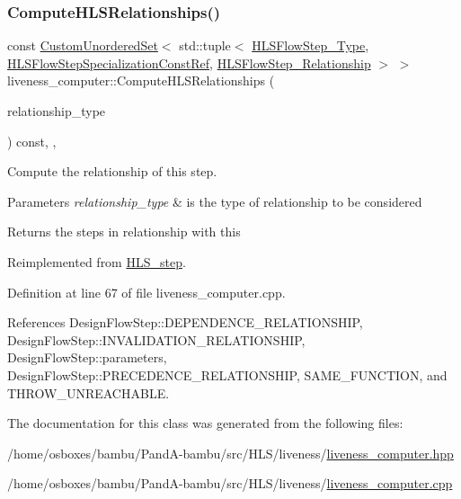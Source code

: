 \subsubsection{\texorpdfstring{Compute\+H\+L\+S\+Relationships()}{ComputeHLSRelationships()}}
{\footnotesize\ttfamily const \hyperlink{classCustomUnorderedSet}{Custom\+Unordered\+Set}$<$ std\+::tuple$<$ \hyperlink{hls__step_8hpp_ada16bc22905016180e26fc7e39537f8d}{H\+L\+S\+Flow\+Step\+\_\+\+Type}, \hyperlink{hls__step_8hpp_a5fdd2edf290c196531d21d68e13f0e74}{H\+L\+S\+Flow\+Step\+Specialization\+Const\+Ref}, \hyperlink{hls__step_8hpp_a3ad360b9b11e6bf0683d5562a0ceb169}{H\+L\+S\+Flow\+Step\+\_\+\+Relationship} $>$ $>$ liveness\+\_\+computer\+::\+Compute\+H\+L\+S\+Relationships (\begin{DoxyParamCaption}\item[{const \hyperlink{classDesignFlowStep_a723a3baf19ff2ceb77bc13e099d0b1b7}{Design\+Flow\+Step\+::\+Relationship\+Type}}]{relationship\+\_\+type }\end{DoxyParamCaption}) const\hspace{0.3cm}{\ttfamily [override]}, {\ttfamily [protected]}, {\ttfamily [virtual]}}



Compute the relationship of this step. 


\begin{DoxyParams}{Parameters}
{\em relationship\+\_\+type} & is the type of relationship to be considered \\
\hline
\end{DoxyParams}
\begin{DoxyReturn}{Returns}
the steps in relationship with this 
\end{DoxyReturn}


Reimplemented from \hyperlink{classHLS__step_aed0ce8cca9a1ef18e705fc1032ad4de5}{H\+L\+S\+\_\+step}.



Definition at line 67 of file liveness\+\_\+computer.\+cpp.



References Design\+Flow\+Step\+::\+D\+E\+P\+E\+N\+D\+E\+N\+C\+E\+\_\+\+R\+E\+L\+A\+T\+I\+O\+N\+S\+H\+IP, Design\+Flow\+Step\+::\+I\+N\+V\+A\+L\+I\+D\+A\+T\+I\+O\+N\+\_\+\+R\+E\+L\+A\+T\+I\+O\+N\+S\+H\+IP, Design\+Flow\+Step\+::parameters, Design\+Flow\+Step\+::\+P\+R\+E\+C\+E\+D\+E\+N\+C\+E\+\_\+\+R\+E\+L\+A\+T\+I\+O\+N\+S\+H\+IP, S\+A\+M\+E\+\_\+\+F\+U\+N\+C\+T\+I\+ON, and T\+H\+R\+O\+W\+\_\+\+U\+N\+R\+E\+A\+C\+H\+A\+B\+LE.



The documentation for this class was generated from the following files\+:\begin{DoxyCompactItemize}
\item 
/home/osboxes/bambu/\+Pand\+A-\/bambu/src/\+H\+L\+S/liveness/\hyperlink{liveness__computer_8hpp}{liveness\+\_\+computer.\+hpp}\item 
/home/osboxes/bambu/\+Pand\+A-\/bambu/src/\+H\+L\+S/liveness/\hyperlink{liveness__computer_8cpp}{liveness\+\_\+computer.\+cpp}\end{DoxyCompactItemize}
